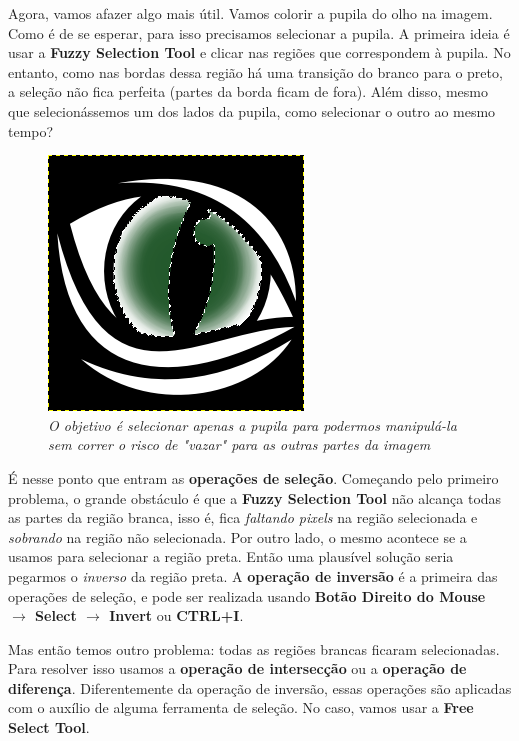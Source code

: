 \documentclass[12pt,onecolumn]{article}
\begin{document}
    Agora, vamos afazer algo mais útil. Vamos colorir a pupila do olho na
    imagem. Como é de se esperar, para isso precisamos selecionar a pupila. A
    primeira ideia é usar a {\bf Fuzzy Selection Tool} e clicar nas regiões que
    correspondem à pupila. No entanto, como nas bordas dessa região há uma
    transição do branco para o preto, a seleção não fica perfeita (partes da
    borda ficam de fora). Além disso, mesmo que selecionássemos um dos lados da
    pupila, como selecionar o outro ao mesmo tempo?
    
    \begin{figure}[ht]
      \centering
      \includegraphics[width=.5\textwidth]{screenshots/04-pupil.png}
      \caption{
        \footnotesize
        \it
        O objetivo é selecionar apenas a pupila para podermos manipulá-la sem
        correr o risco de "vazar" para as outras partes da imagem
      }
      \label{fig:pupil}
    \end{figure}
    
    É nesse ponto que entram as {\bf operações de seleção}. Começando pelo
    primeiro problema, o grande obstáculo é que a {\bf Fuzzy Selection Tool} não
    alcança todas as partes da região branca, isso é, fica {\it faltando pixels}
    na região selecionada e {\it sobrando} na região não selecionada. Por outro
    lado, o mesmo acontece se a usamos para selecionar a região preta. Então uma
    plausível solução seria pegarmos o {\it inverso} da região preta. A {\bf
    operação de inversão} é a primeira das operações de seleção, e pode ser
    realizada usando {\bf Botão Direito do Mouse $\rightarrow$ Select
    $\rightarrow$ Invert} ou {\bf CTRL+I}.
    
    Mas então temos outro problema: todas as regiões brancas ficaram
    selecionadas. Para resolver isso usamos a {\bf operação de intersecção} ou
    a {\bf operação de diferença}. Diferentemente da operação de inversão, essas
    operações são aplicadas com o auxílio de alguma ferramenta de seleção. No
    caso, vamos usar a {\bf Free Select Tool}.
    
\end{document}
